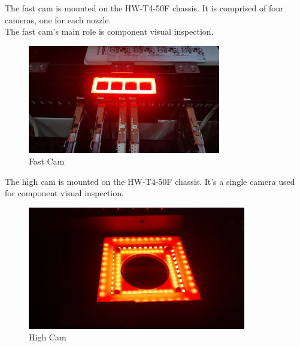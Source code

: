 \documentclass[a4paper,10pt]{report}
\begin{document}
The fast cam is mounted on the HW-T4-50F chassis. It is comprised of four cameras, one for each nozzle.\\
The fast cam's main role is component visual inspection.
\begin{figure}[!htb]
 \centering
 \includegraphics[width=0.75\textwidth]{images/fcam.jpg}
 \caption{Fast Cam}
\end{figure}

\newpage
The high cam is mounted on the HW-T4-50F chassis. It's a single camera used for component visual inspection.\\
\begin{figure}[!htb]
 \centering
 \includegraphics[width=0.85\textwidth]{images/hcam.jpg}
 \caption{High Cam}
\end{figure}


\newpage
\end{document}
